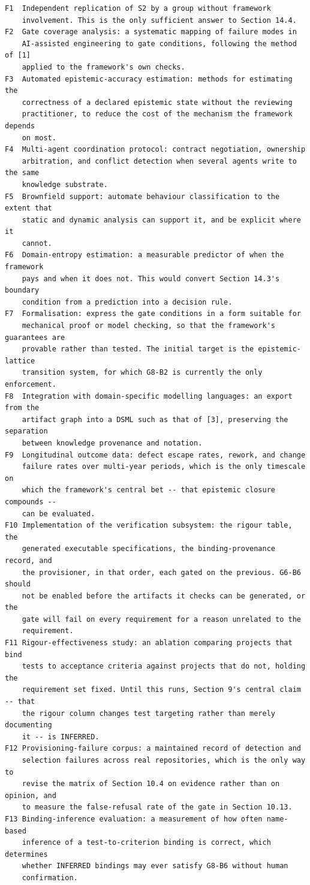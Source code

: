 \documentclass[11pt,a4paper]{article}
\begin{document}
\begin{Verbatim}[fontsize=\footnotesize,breaklines=true,breakanywhere=true,breakautoindent=false,samepage=false]
F1  Independent replication of S2 by a group without framework
    involvement. This is the only sufficient answer to Section 14.4.
F2  Gate coverage analysis: a systematic mapping of failure modes in
    AI-assisted engineering to gate conditions, following the method of [1]
    applied to the framework's own checks.
F3  Automated epistemic-accuracy estimation: methods for estimating the
    correctness of a declared epistemic state without the reviewing
    practitioner, to reduce the cost of the mechanism the framework depends
    on most.
F4  Multi-agent coordination protocol: contract negotiation, ownership
    arbitration, and conflict detection when several agents write to the same
    knowledge substrate.
F5  Brownfield support: automate behaviour classification to the extent that
    static and dynamic analysis can support it, and be explicit where it
    cannot.
F6  Domain-entropy estimation: a measurable predictor of when the framework
    pays and when it does not. This would convert Section 14.3's boundary
    condition from a prediction into a decision rule.
F7  Formalisation: express the gate conditions in a form suitable for
    mechanical proof or model checking, so that the framework's guarantees are
    provable rather than tested. The initial target is the epistemic-lattice
    transition system, for which G8-B2 is currently the only enforcement.
F8  Integration with domain-specific modelling languages: an export from the
    artifact graph into a DSML such as that of [3], preserving the separation
    between knowledge provenance and notation.
F9  Longitudinal outcome data: defect escape rates, rework, and change
    failure rates over multi-year periods, which is the only timescale on
    which the framework's central bet -- that epistemic closure compounds --
    can be evaluated.
F10 Implementation of the verification subsystem: the rigour table, the
    generated executable specifications, the binding-provenance record, and
    the provisioner, in that order, each gated on the previous. G6-B6 should
    not be enabled before the artifacts it checks can be generated, or the
    gate will fail on every requirement for a reason unrelated to the
    requirement.
F11 Rigour-effectiveness study: an ablation comparing projects that bind
    tests to acceptance criteria against projects that do not, holding the
    requirement set fixed. Until this runs, Section 9's central claim -- that
    the rigour column changes test targeting rather than merely documenting
    it -- is INFERRED.
F12 Provisioning-failure corpus: a maintained record of detection and
    selection failures across real repositories, which is the only way to
    revise the matrix of Section 10.4 on evidence rather than on opinion, and
    to measure the false-refusal rate of the gate in Section 10.13.
F13 Binding-inference evaluation: a measurement of how often name-based
    inference of a test-to-criterion binding is correct, which determines
    whether INFERRED bindings may ever satisfy G8-B6 without human
    confirmation.
\end{Verbatim}
\end{document}
